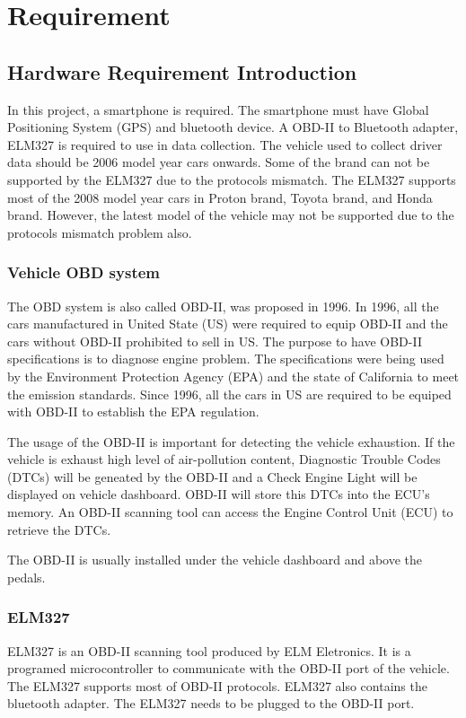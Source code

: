 \chapter{Requirement}
\section{Hardware Requirement Introduction}
In this project, a smartphone is required. The smartphone must have Global Positioning System (GPS) and bluetooth device. A OBD-II to Bluetooth adapter, ELM327 is required to use in data collection. The vehicle used to collect driver data should be 2006 model year cars onwards. Some of the brand can not be supported by the ELM327 due to the protocols mismatch. The ELM327 supports most of the 2008 model year cars in Proton brand, Toyota brand, and Honda brand. However, the latest model of the vehicle may not be supported due to the protocols mismatch problem also.

\subsection{Vehicle OBD system}
The OBD system is also called OBD-II, was proposed in 1996. In 1996, all the cars manufactured in United State (US) were required to equip OBD-II and the cars without OBD-II prohibited to sell in US. The purpose to have OBD-II specifications is to diagnose engine problem. The specifications were being used by the Environment Protection Agency (EPA) and the state of California to meet the emission standards. Since 1996, all the cars in US are required to be equiped with OBD-II to establish the EPA regulation. 

The usage of the OBD-II is important for detecting the vehicle exhaustion. If the vehicle is exhaust high level of air-pollution content, Diagnostic Trouble Codes (DTCs) will be geneated by the OBD-II and a Check Engine Light will be displayed on vehicle dashboard. OBD-II will store this DTCs into the ECU's memory. An OBD-II scanning tool can access the Engine Control Unit (ECU) to retrieve the DTCs.

The OBD-II is usually installed under the vehicle dashboard and above the pedals.

\subsection{ELM327}
ELM327 is an OBD-II scanning tool produced by ELM Eletronics. It is a programed microcontroller to communicate with the OBD-II port of the vehicle. The ELM327 supports most of OBD-II protocols. ELM327 also contains the bluetooth adapter. The ELM327 needs to be plugged to the OBD-II port.

